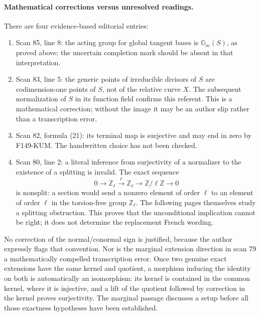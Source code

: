 \paragraph{Mathematical corrections versus unresolved readings.}
There are four evidence-based editorial entries:
\begin{enumerate}
 \item Scan 85, line 8: the acting group for global tangent bases is
 \(\mathbb G_m(S)\), as proved above; the uncertain completion mark
 should be absent in that interpretation.
 \item Scan 83, line 5: the generic points of irreducible divisors of
 \(S\) are codimension-one points of \(S\), not of the relative curve
 \(X\).  The subsequent normalization of \(S\) in its function field
 confirms this referent.  This is a mathematical correction; without
 the image it may be an author slip rather than a transcription error.
 \item Scan 82, formula (21): its terminal map is surjective and may
 end in zero by F149-KUM.  The handwritten choice has not been checked.
 \item Scan 80, line 2: a literal inference from surjectivity of a
 normalizer to the existence of a splitting is invalid.  The exact
 sequence
 \[
 0\longrightarrow\mathbb Z_\ell
 \xrightarrow{\;\ell\;}\mathbb Z_\ell
 \longrightarrow\mathbb Z/\ell\mathbb Z\longrightarrow0
 \]
 is nonsplit: a section would send a nonzero element of order \(\ell\)
 to an element of order \(\ell\) in the torsion-free group
 \(\mathbb Z_\ell\).  The following pages themselves study a splitting
 obstruction.  This proves that the unconditional implication cannot
 be right; it does not determine the replacement French wording.
\end{enumerate}

No correction of the normal/conormal sign is justified, because the
author expressly flags that convention.  Nor is the marginal extension
direction in scan 79 a mathematically compelled transcription error.
Once two genuine exact extensions have the same kernel and quotient,
a morphism inducing the identity on both is automatically an
isomorphism: its kernel is contained in the common kernel, where it
is injective, and a lift of the quotient followed by correction in the
kernel proves surjectivity.  The marginal passage discusses a setup
before all those exactness hypotheses have been established.

